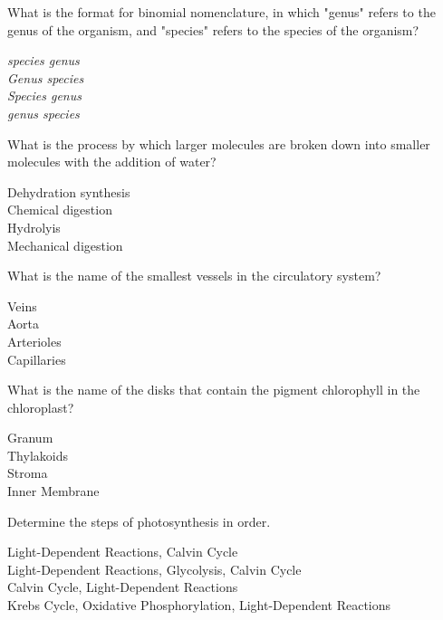\documentclass[a4paper,12pt]{exam}
\begin{document}
\begin{questions}
	\question What is the format for binomial nomenclature, in which "genus" refers to the genus of the organism, and "species" refers to the species of the organism?
	
	\begin{oneparchoices}
		\choice \textit{species genus}
		\\
		\choice \textit{Genus species}
		\\
		\choice \textit{Species genus}
		\\
		\choice \textit{genus species}
	\end{oneparchoices}

	\question What is the process by which larger molecules are broken down into smaller molecules with the addition of water?
	
	\begin{oneparchoices}
		\choice Dehydration synthesis
		\\
		\choice Chemical digestion
		\\
		\choice Hydrolyis
		\\
		\choice Mechanical digestion
	\end{oneparchoices}

	\question What is the name of the smallest vessels in the circulatory system?
	
	\begin{oneparchoices}
		\choice Veins
		\\
		\choice Aorta
		\\
		\choice Arterioles
		\\
		\choice Capillaries
	\end{oneparchoices}

	\question What is the name of the disks that contain the pigment chlorophyll in the chloroplast?
	
	\begin{oneparchoices}
		\choice Granum
		\\
		\choice Thylakoids
		\\
		\choice Stroma
		\\
		\choice Inner Membrane
	\end{oneparchoices}

	\question Determine the steps of photosynthesis in order.
	
	\begin{oneparchoices}
		\choice Light-Dependent Reactions, Calvin Cycle
		\\
		\choice Light-Dependent Reactions, Glycolysis, Calvin Cycle
		\\
		\choice Calvin Cycle, Light-Dependent Reactions
		\\
		\choice Krebs Cycle, Oxidative Phosphorylation, Light-Dependent Reactions
	\end{oneparchoices}


\end{questions}
\end{document}
